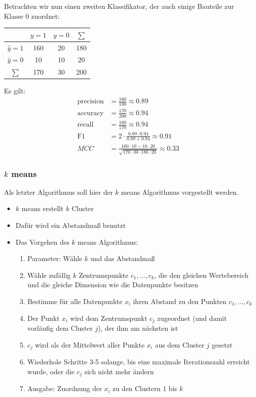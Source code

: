 \begin{frame}
Betrachten wir nun einen zweiten Klassifikator, der auch einige Bauteile zur Klasse $0$ zuordnet:
\begin{center}\begin{tabular}{|c|c|c|c|}
\hline 
 & $ y = 1 $ & $y = 0$ & $\sum$ \\ 
\hline 
$\hat{y} = 1 $& 160 & 20 & 180 \\ 
\hline 
$\hat{y} = 0 $ & 10 & 10 & 20 \\ 
\hline 
$\sum$ & 170 & 30 & 200 \\ 
\hline 
\end{tabular}\end{center}
Es gilt:\pause
\begin{align*}
\text{precision} &= \frac{160}{180} \approx 0.89 \\ 
\text{accuracy} &= \frac{170}{200} \approx 0.94 \\
\text{recall} &= \frac{160}{170} \approx 0.94 \\ 
\text{F1} &= 2\cdot \frac{0.89\cdot 0.94}{0.89+0.94} \approx 0.91\\
MCC &= \frac{160\cdot 10 - 10\cdot 20}{\sqrt{170\cdot 30\cdot 180\cdot 20}} \approx 0.33
\end{align*}
\end{frame}
\begin{frame}
\frametitle{$k$ means}
Als letzter Algorithmus soll hier der $k$ means Algorithmus vorgestellt werden.
\begin{itemize}[<+->]
\item $k$ means erstellt $k$ Cluster
\item Dafür wird ein Abstandmaß benutzt
\item Das Vorgehen des $k$ means Algorithmus:
\begin{enumerate}[<+->]
\item Parameter: Wähle $k$ und das Abstandmaß
\item Wähle zufällig $k$ Zentrumspunkte $c_1,\ldots,c_k$, die den gleichen Wertebereich und die gleiche Dimension wie die Datenpunkte besitzen
\item Bestimme für alle Datenpunkte $x_i$ ihren Abstand zu den Punkten $c_1,\ldots,c_k$
\item Der Punkt $x_i$ wird dem Zentrumspunkt $c_j$ zugeordnet (und damit vorläufig dem Cluster $j$), der ihm am nächsten ist
\item $c_j$ wird als der Mittelwert aller Punkte $x_i$ aus dem Cluster $j$ gesetzt
\item Wiederhole Schritte 3-5 solange, bis eine maximale Iterationszahl erreicht wurde, oder die $c_j$ sich nicht mehr ändern
\item Ausgabe: Zuordnung der $x_i$ zu den Clustern $1$ bis $k$
\end{enumerate}
\end{itemize}
\end{frame}
